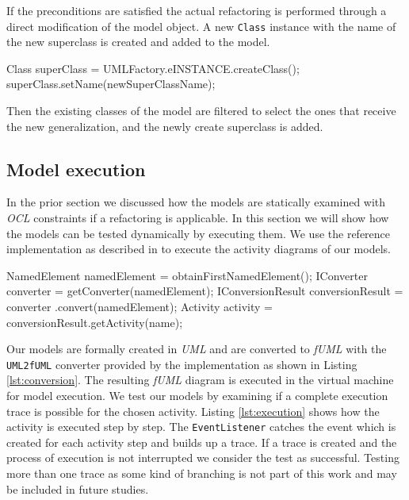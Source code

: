 \documentclass{llncs}
\begin{document}
If the preconditions are satisfied the actual refactoring is performed through a direct modification of the model object.
A new \texttt{Class} instance with the name of the new superclass is created and added to the model. 

\begin{lstsingle}[language=Java,caption=UML element creation,label=lst:createclass]
Class superClass = UMLFactory.eINSTANCE.createClass();
superClass.setName(newSuperClassName);
\end{lstsingle}


Then the existing
classes of the model are filtered to select the ones that receive the new generalization, and the newly create superclass
is added.

\subsection{Model execution}
\label{sec:execution}
In the prior section we discussed how the models are statically examined with \textit{OCL} constraints if a refactoring 
is applicable. In this section we will show how the models can be tested dynamically by executing them. We use the 
reference implementation as described in \cite{DBLP:conf/models/MayerhoferLK12} to execute the activity diagrams of 
our models.

\begin{lstsingle}[language=Java,caption=Converting the UML diagram to fUML,label=lst:conversion]
NamedElement namedElement = obtainFirstNamedElement();
IConverter converter = getConverter(namedElement);
IConversionResult conversionResult = converter
  .convert(namedElement);
Activity activity = conversionResult.getActivity(name);
\end{lstsingle}

Our models are formally created in \textit{UML} and are converted to \textit{fUML} with the \texttt{UML2fUML} converter 
provided by the implementation as shown in Listing \ref{lst:conversion}. The resulting \textit{fUML} diagram is executed in the 
virtual machine for model execution. 
We test our models by examining if a complete execution trace is possible for the chosen activity. Listing \ref{lst:execution} 
shows how the activity is executed step by step. The \texttt{EventListener} catches the event which is created for each 
activity step and builds up a trace. If a trace is created and the process of execution is not interrupted we consider the 
test as successful. Testing more than one trace as some kind of branching is not part of this work and may be included in future studies.
\end{document}
